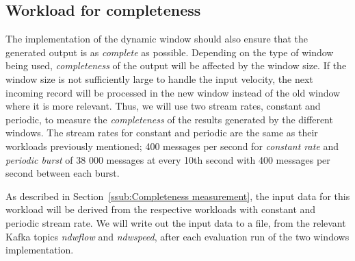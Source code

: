 \subsection{Workload for completeness}
The implementation of the dynamic window should also ensure that the generated 
output is as \emph{complete} as possible. 
Depending on the type of window being used, \emph{completeness} of the output will be
affected by the window size. If the window size is not sufficiently large to handle 
the input velocity, the next incoming record will be processed in the new window instead of 
the old window where it is more relevant. Thus, 
we will use two stream rates, constant and periodic, to measure the \emph{completeness} of the results generated 
by the different windows. The stream rates for constant and periodic are the same as their 
workloads previously mentioned; 400 messages per second for \emph{constant rate} and 
\emph{periodic burst} of 38 000 messages at every 10th second with 400 messages per second 
between each burst.

As described in Section~\ref{ssub:Completeness measurement}, 
the input data for this workload will be derived from the respective workloads with 
constant and periodic stream rate. We will write out the input data to a file, from the relevant Kafka 
topics \emph{ndwflow} and \emph{ndwspeed}, after each evaluation run of the two windows implementation. 





